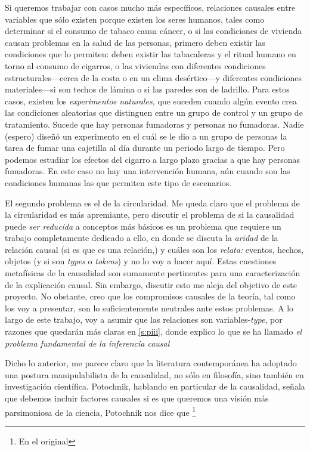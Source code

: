 Si queremos trabajar con casos mucho más específicos,
relaciones causales entre variables que sólo existen porque
existen los seres humanos, tales como determinar si el
consumo de tabaco causa cáncer, o si las condiciones de
vivienda causan problemas en la salud de las personas,
primero deben existir las condiciones que lo permiten: deben
existir las tabacaleras y el ritual humano en torno al
consumo de cigarros, o las viviendas con diferentes
condiciones estructurales---cerca de la costa o en un clima
desértico---y diferentes condiciones materiales---si son
techos de lámina o si las paredes son de ladrillo. Para
estos casos, existen los \emph{experimentos naturales,} que
suceden cuando algún evento crea las condiciones aleatorias
que distinguen entre un grupo de control y un grupo de
tratamiento. Sucede que hay personas fumadoras y personas no
fumadoras. Nadie (espero) diseñó un experimento en el cuál
se le dio a un grupo de personas la tarea de fumar una
cajetilla al día durante un periodo largo de tiempo. Pero
podemos estudiar los efectos del cigarro a largo plazo
gracias a que hay personas fumadoras. En este caso no hay
una intervención humana, aún cuando son las condiciones
humanas las que permiten este tipo de escenarios. 

El segundo problema es el de la circularidad. Me queda claro
que el problema de la circularidad es más apremiante, pero
discutir el problema de si la causalidad puede \emph{ser
reducida} a conceptos más básicos es un problema que
requiere un trabajo completamente dedicado a ello, en donde
se discuta la \emph{aridad} de la relación causal (si es que
es una relación,) y cuáles son los \emph{relata:} eventos,
hechos, objetos (y si son \emph{types} o \emph{tokens}) y no
lo voy a hacer aquí. Estas cuestiones metafísicas de la
causalidad son sumamente pertinentes para una
caracterización de la explicación causal. Sin embargo, discutir
esto me aleja del objetivo de este proyecto. No obstante,
creo que los compromisos causales de la teoría, tal como los voy a
presentar, son lo suficientemente neutrales ante estos
problemas. A lo largo de este trabajo, voy a asumir que las relaciones son
variables-\emph{type}, por razones que quedarán más claras
en \ref{s:piii}, donde explico lo que
se ha llamado \emph{el problema fundamental de la inferencia
causal}

Dicho lo anterior, me parece claro que la literatura
contemporánea ha adoptado una postura manipulabilista de la
causalidad, no sólo en filosofía, sino también en
investigación científica. Potochnik, hablando en particular
de la causalidad, señala que debemos incluir factores
causales si es que queremos una visión más parsimoniosa de
la ciencia, Potochnik nos dice que \footnote{
  En el original 
}
\parencite[][p.~24]{Potochnik2017-POTIAT-3}

